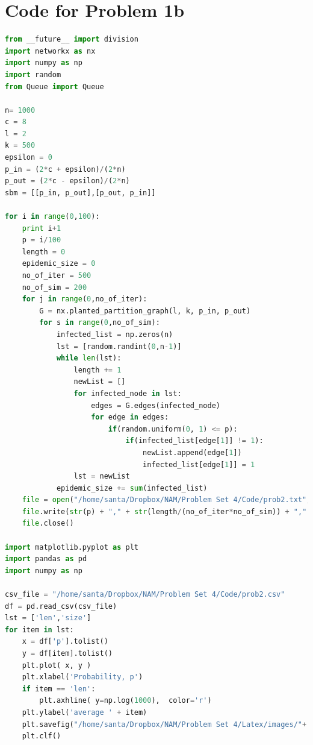 \documentclass{article}
\begin{document}
\section*{Code for Problem 1b}
\begin{lstlisting}[language=Python, breaklines=true]
from __future__ import division
import networkx as nx
import numpy as np
import random
from Queue import Queue

n= 1000
c = 8
l = 2
k = 500
epsilon = 0
p_in = (2*c + epsilon)/(2*n)
p_out = (2*c - epsilon)/(2*n)
sbm = [[p_in, p_out],[p_out, p_in]]

for i in range(0,100):
    print i+1
    p = i/100
    length = 0
    epidemic_size = 0
    no_of_iter = 500
    no_of_sim = 200
    for j in range(0,no_of_iter):
        G = nx.planted_partition_graph(l, k, p_in, p_out)
        for s in range(0,no_of_sim):
            infected_list = np.zeros(n)
            lst = [random.randint(0,n-1)]
            while len(lst):
                length += 1
                newList = []
                for infected_node in lst:
                    edges = G.edges(infected_node)
                    for edge in edges:
                        if(random.uniform(0, 1) <= p):
                            if(infected_list[edge[1]] != 1):
                                newList.append(edge[1])
                                infected_list[edge[1]] = 1
                lst = newList
            epidemic_size += sum(infected_list)
    file = open("/home/santa/Dropbox/NAM/Problem Set 4/Code/prob2.txt", "a")
    file.write(str(p) + "," + str(length/(no_of_iter*no_of_sim)) + "," + str(epidemic_size/(no_of_iter*no_of_sim)) + "\n")
    file.close()

import matplotlib.pyplot as plt
import pandas as pd
import numpy as np

csv_file = "/home/santa/Dropbox/NAM/Problem Set 4/Code/prob2.csv"
df = pd.read_csv(csv_file)
lst = ['len','size']
for item in lst:
    x = df['p'].tolist()
    y = df[item].tolist()
    plt.plot( x, y )
    plt.xlabel('Probability, p')
    if item == 'len':
        plt.axhline( y=np.log(1000),  color='r')
    plt.ylabel('average ' + item)
    plt.savefig("/home/santa/Dropbox/NAM/Problem Set 4/Latex/images/"+ item+".png")
    plt.clf()
\end{lstlisting}
\end{document}
